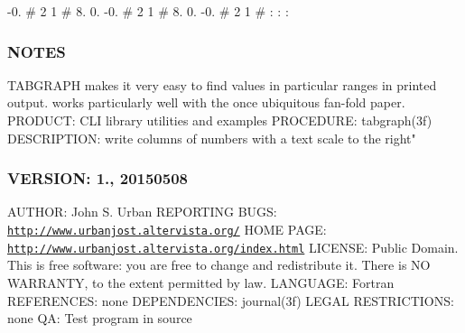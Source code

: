 -\/0. \# 2 1 \# 8. 0. -\/0. \# 2 1 \# 8. 0. -\/0. \# 2 1 \# \+: \+: \+:

\subsubsection*{N\+O\+T\+ES}

T\+A\+B\+G\+R\+A\+PH makes it very easy to find values in particular ranges in printed output. works particularly well with the once ubiquitous fan-\/fold paper. P\+R\+O\+D\+U\+CT\+: C\+LI library utilities and examples P\+R\+O\+C\+E\+D\+U\+RE\+: tabgraph(3f) D\+E\+S\+C\+R\+I\+P\+T\+I\+ON\+: write columns of numbers with a text scale to the right" \subsubsection*{V\+E\+R\+S\+I\+ON\+: 1., 20150508}

A\+U\+T\+H\+OR\+: John S. Urban R\+E\+P\+O\+R\+T\+I\+NG B\+U\+GS\+: \href{http://www.urbanjost.altervista.org/}{\tt http\+://www.\+urbanjost.\+altervista.\+org/} H\+O\+ME P\+A\+GE\+: \href{http://www.urbanjost.altervista.org/index.html}{\tt http\+://www.\+urbanjost.\+altervista.\+org/index.\+html} L\+I\+C\+E\+N\+SE\+: Public Domain. This is free software\+: you are free to change and redistribute it. There is NO W\+A\+R\+R\+A\+N\+TY, to the extent permitted by law. L\+A\+N\+G\+U\+A\+GE\+: Fortran R\+E\+F\+E\+R\+E\+N\+C\+ES\+: none D\+E\+P\+E\+N\+D\+E\+N\+C\+I\+ES\+: journal(3f) L\+E\+G\+AL R\+E\+S\+T\+R\+I\+C\+T\+I\+O\+NS\+: none QA\+: Test program in source 